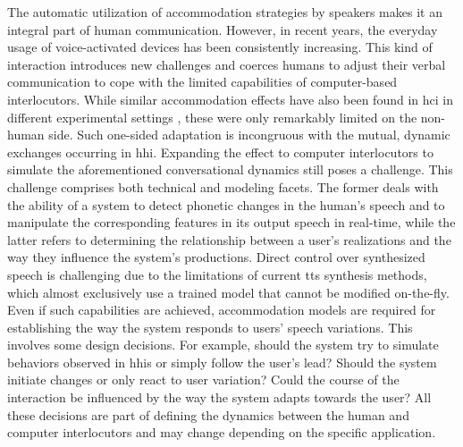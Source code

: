 The automatic utilization of accommodation strategies by speakers makes it an integral part of human communication.
However, in recent years, the everyday usage of voice-activated devices has been consistently increasing.
This kind of interaction introduces new challenges and coerces humans to adjust their verbal communication to cope with the limited capabilities of computer-based interlocutors.
While similar accommodation effects have also been found in \acl{hci} in different experimental settings \citep[e.g.,][]{Bell2003prosodic, Levitan2013entrainment, Parent2010lexical}, these were only remarkably limited on the non-human side.
Such one-sided adaptation is incongruous with the mutual, dynamic exchanges occurring in \acl{hhi}.
Expanding the effect to computer interlocutors to simulate the aforementioned conversational dynamics still poses a challenge.
This challenge comprises both technical and modeling facets.
The former deals with the ability of a system to detect phonetic changes in the human's speech and to manipulate the corresponding features in its output speech in real-time, while the latter refers to determining the relationship between a user's realizations and the way they influence the system's productions.
Direct control over synthesized speech is challenging due to the limitations of current \acl{tts} synthesis methods, which almost exclusively use a trained model that cannot be modified on-the-fly.
Even if such capabilities are achieved, accommodation models are required for establishing the way the system responds to users' speech variations.
This involves some design decisions.
For example, should the system try to simulate behaviors observed in \aclp{hhi} or simply follow the user's lead?
Should the system initiate changes or only react to user variation?
Could the course of the interaction be influenced by the way the system adapts towards the user?
All these decisions are part of defining the dynamics between the human and computer interlocutors and may change depending on the specific application.

